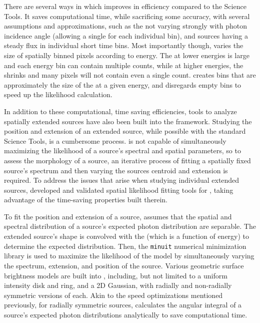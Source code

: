 {There are several ways in which \ptlike{} improves in efficiency compared to the Science Tools. It saves computational time, while sacrificing some accuracy,
with several assumptions and approximations, such as the \psf{} not varying strongly with photon incidence angle (allowing a single \psf{} for each individual bin), and sources having a steady flux in individual short time bins. Most importantly though, \ptlike{} varies the size of spatially binned \heal{} pixels \citep{Gorski05} according to energy. The \psf{} at lower energies is large and each energy bin can contain multiple counts, while at higher energies, the \psf{} shrinks and many pixels will not contain even a single count. \ptlike{} creates \heal{} bins that are approximately the size of the \psf{} at a given energy, and disregards empty bins to speed up the likelihood calculation.

In addition to these computational, time saving efficiencies, tools to analyze spatially extended sources have also been built into the \ptlike{} framework. Studying the position and extension of an extended source, while possible with the standard \Fermi{} Science Tools, is a cumbersome process. \gtlike{} is not capable of simultaneously maximizing the likelihood of a source's spectral and spatial parameters, so to assess the morphology of a source, an iterative process of fitting a spatially fixed source's spectrum and then varying the sources centroid and extension is required. To address the issues that arise when studying individual extended sources, \cite{Lande12} developed and validated spatial likelihood fitting tools for \ptlike{}, taking advantage of the time-saving properties built therein.

To fit the position and extension of a source, \ptlike{} assumes that the spatial and spectral distribution of a source's expected photon distribution are separable. The extended source's shape is convolved with the \lat{} \psf{} (which is a function of energy) to determine the expected distribution. Then, the {\tt minuit} numerical minimization library\citep{James75} is used to maximize the likelihood of the model by simultaneously varying the spectrum, extension, and position of the source. Various geometric surface brightness models are built into \ptlike{}, including, but not limited to a uniform intensity disk and ring, and a 2D Gaussian, with radially and non-radially symmetric versions of each. Akin to the speed optimizations mentioned previously, for radially symmetric sources, \ptlike{} calculates the angular integral of a source's expected photon distributions analytically to save computational time.

}
